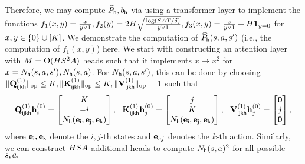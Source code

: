 Therefore, we may compute $\widehat{P}_{\mathsf{h}},{b}_{\mathsf{h}}$ via using a transformer layer  to implement the functions $f_1(x,y)=\frac{x}{y\vee1},f_2(y)=2{H}\sqrt{\frac{\log({S}{A}{T}/\delta)}{y\vee 1}},f_3(x,y)=\frac{x}{y\vee1}+{H}{\mathbf 1}_{y=0}$ for $x,y\in\{0\}\cup[{K}]$. 
We demonstrate the computation of $\widehat{P}_{\mathsf{h}}({s},{a},{s}')$  (i.e., the computation of $f_1(x,y)$) here. We start with constructing an attention layer with ${M}={\mathrm{O}}({H}{S}^2{A})$ heads such that it implements  $x\mapsto x^2$ for $x={N}_{\mathsf{h}}({s},{a},{s}'),{N}_{\mathsf{h}}({s},{a})$. For ${N}_{\mathsf{h}}({s},{a},{s}')$, this can be done by  choosing  $\|{{\mathbf Q}_{{\mathsf{i}}{\mathsf{j}}{\mathsf{k}}{\mathsf{h}}}^{(1)}}\|_{\mathrm{op}}\leq{K},\|{{\mathbf K}_{{\mathsf{i}}{\mathsf{j}}{\mathsf{k}}{\mathsf{h}}}^{(1)}}\|_{\mathrm{op}}\leq{K},\|{{\mathbf V}_{{\mathsf{i}}{\mathsf{j}}{\mathsf{k}}{\mathsf{h}}}^{(1)}}\|_{\mathrm{op}}=1$ such that
\begin{align*}
    {\mathbf Q}_{{\mathsf{i}}{\mathsf{j}}{\mathsf{k}}{\mathsf{h}}}^{(1)}{\mathbf h}_i^{(0)}=\begin{bmatrix}
        {K}\\
        -i\\
        {N}_{\mathsf{h}}({\mathbf e}_{\mathsf{i}},{\mathbf e}_{\mathsf{j}},{\mathbf e}_{\mathsf{k}})
    \end{bmatrix},~~{\mathbf K}_{{\mathsf{i}}{\mathsf{j}}{\mathsf{k}}{\mathsf{h}}}^{(1)}{\mathbf h}_j^{(0)}=\begin{bmatrix}
        j\\ {K}\\
        {N}_{\mathsf{h}}({\mathbf e}_{\mathsf{i}},{\mathbf e}_{\mathsf{j}},{\mathbf e}_{\mathsf{k}})
    \end{bmatrix},~~
    {\mathbf V}_{{\mathsf{i}}{\mathsf{j}}{\mathsf{k}}{\mathsf{h}}}^{(1)}{\mathbf h}_j^{(0)}=\begin{bmatrix}
        {\mathbf 0}\\j\\{\mathbf 0}
    \end{bmatrix}, 
\end{align*} where ${\mathbf e}_{\mathsf{i}},{\mathbf e}_{\mathsf{k}}$ denote the $i,j$-th states and ${\mathbf e}_{sj}$ denotes the $k$-th action.
Similarly, we can construct ${H}{S}{A}$ additional heads
to compute ${N}_{\mathsf{h}}({s},{a})^2$ for all possible ${s},{a}.$

